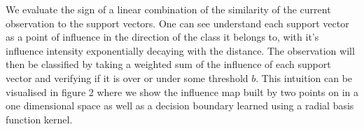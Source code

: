 We evaluate the sign of a linear combination of the similarity of the current observation to the support vectors. One can see understand each support vector as a point of influence in the direction of the class it belongs to, with it's influence intensity exponentially decaying with the distance. The observation will then be classified by taking a weighted sum of the influence of each support vector and verifying if it is over or under some threshold $b$. This intuition can be visualised in figure 2 where we show the influence map built by two points on in a one dimensional space as well as a decision boundary learned using a radial basis function kernel.


